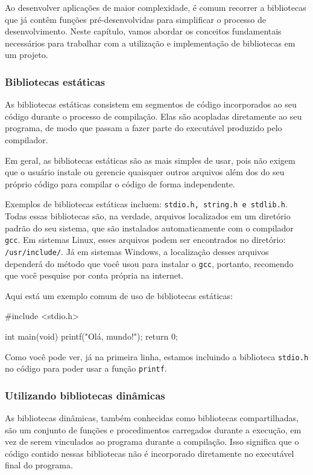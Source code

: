 Ao desenvolver aplicações de maior complexidade, é comum recorrer a 
bibliotecas que já contêm funções pré-desenvolvidas para simplificar o 
processo de desenvolvimento. Neste capítulo, vamos abordar os conceitos 
fundamentais necessários para trabalhar com a utilização e implementação de 
bibliotecas em um projeto.

\subsubsection{Bibliotecas estáticas}

As bibliotecas estáticas consistem em segmentos de código incorporados ao 
seu código durante o processo de compilação. Elas são acopladas diretamente 
ao seu programa, de modo que passam a fazer parte do executável produzido 
pelo compilador.

Em geral, as bibliotecas estáticas são as mais simples de usar, pois não 
exigem que o usuário instale ou gerencie quaisquer outros arquivos além dos 
do seu próprio código para compilar o código de forma independente.

Exemplos de bibliotecas estáticas incluem: \texttt{stdio.h, string.h e 
stdlib.h}. Todas essas bibliotecas são, na verdade, arquivos localizados em 
um diretório padrão do seu sistema, que são instalados automaticamente com 
o compilador \texttt{gcc}. Em sistemas Linux, esses arquivos podem ser 
encontrados no diretório: \texttt{/usr/include/}. Já em sistemas Windows, 
a localização desses arquivos dependerá do método que você 
usou para instalar o \texttt{gcc}, portanto, recomendo que você pesquise por 
conta própria na internet.

Aqui está um exemplo comum de uso de bibliotecas estáticas:

\begin{excode}
    #include <stdio.h>

    int main(void)
    {
        printf("Olá, mundo!\n");
        return 0;
    }
\end{excode}

Como você pode ver, já na primeira linha, estamos incluindo a biblioteca \texttt{stdio.h} no código para poder usar a função \texttt{printf}.

\subsubsection{Utilizando bibliotecas dinâmicas}

As bibliotecas dinâmicas, também conhecidas como bibliotecas compartilhadas, 
são um conjunto de funções e procedimentos carregados durante a execução, 
em vez de serem vinculados ao programa durante a compilação. Isso significa 
que o código contido nessas bibliotecas não é incorporado diretamente no 
executável final do programa.

